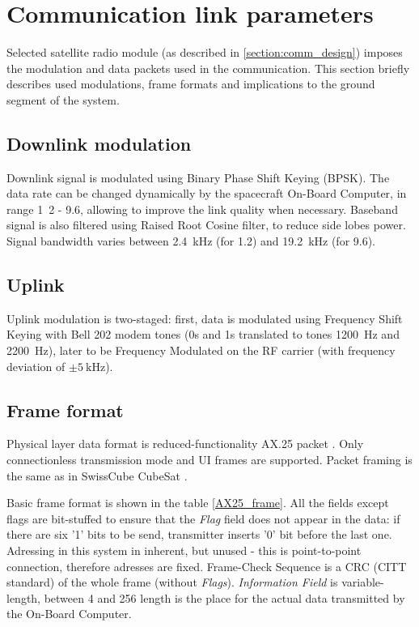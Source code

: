 

\section{Communication link parameters}
Selected satellite radio module (as described in \autoref{section:comm_design}) imposes the modulation and data packets used in the communication. This section briefly describes used modulations, frame formats and implications to the ground segment of the system.

\subsection{Downlink modulation}
Downlink signal is modulated using Binary Phase Shift Keying (BPSK). The data rate can be changed dynamically by the spacecraft On-Board Computer, in range \si{1.2} - \SI{9.6}{\kbps}, allowing to improve the link quality when necessary. Baseband signal is also filtered using Raised Root Cosine filter, to reduce side lobes power. Signal bandwidth varies between \SI{2.4}{\kHz} (for \SI{1.2}{\kbps}) and \SI{19.2}{\kHz} (for \SI{9.6}{\kbps}).


\subsection{Uplink}
Uplink modulation is two-staged: first, data is modulated using Frequency Shift Keying with Bell 202 modem tones (0s and 1s translated to tones \SI{1200}{\hertz} and \SI{2200}{\hertz}), later to be Frequency Modulated on the RF carrier (with frequency deviation of $\pm\SI{5}{\kilo\hertz}$).


\subsection{Frame format}
Physical layer data format is reduced-functionality AX.25 packet \cite{AX25_standard}. Only connectionless transmission mode and UI frames are supported. Packet framing is the same as in SwissCube CubeSat \cite{SwissCube_AX25}.

Basic frame format is shown in the table \ref{AX25_frame}. All the fields except flags are bit-stuffed to ensure that the \textit{Flag} field does not appear in the data: if there are six '1' bits to be send, transmitter inserts '0' bit before the last one. Adressing in this system in inherent, but unused - this is point-to-point connection, therefore adresses are fixed. Frame-Check Sequence is a CRC (CITT standard) of the whole frame (without \textit{Flags}). \textit{Information Field} is variable-length, between \si{4} and \SI{256}{\byte} length is the place for the actual data transmitted by the On-Board Computer.

